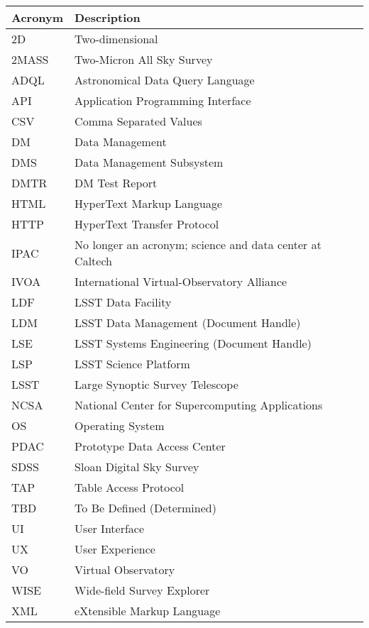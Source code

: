 \addtocounter{table}{-1}
\begin{longtable}{p{}p{}}\hline
\textbf{Acronym} & \textbf{Description}  \\\hline

2D & Two-dimensional \\\hline
2MASS & Two-Micron All Sky Survey \\\hline
ADQL & Astronomical Data Query Language \\\hline
API & Application Programming Interface \\\hline
CSV & Comma Separated Values \\\hline
DM & Data Management \\\hline
DMS & Data Management Subsystem \\\hline
DMTR & DM Test Report \\\hline
HTML & HyperText Markup Language \\\hline
HTTP & HyperText Transfer Protocol \\\hline
IPAC & No longer an acronym; science and data center at Caltech \\\hline
IVOA & International Virtual-Observatory Alliance \\\hline
LDF & LSST Data Facility \\\hline
LDM & LSST Data Management (Document Handle) \\\hline
LSE & LSST Systems Engineering (Document Handle) \\\hline
LSP & LSST Science Platform \\\hline
LSST & Large Synoptic Survey Telescope \\\hline
NCSA & National Center for Supercomputing Applications \\\hline
OS & Operating System \\\hline
PDAC & Prototype Data Access Center \\\hline
SDSS & Sloan Digital Sky Survey \\\hline
TAP & Table Access Protocol \\\hline
TBD & To Be Defined (Determined) \\\hline
UI & User Interface \\\hline
UX & User Experience \\\hline
VO & Virtual Observatory \\\hline
WISE & Wide-field Survey Explorer \\\hline
XML & eXtensible Markup Language \\\hline
\end{longtable}
